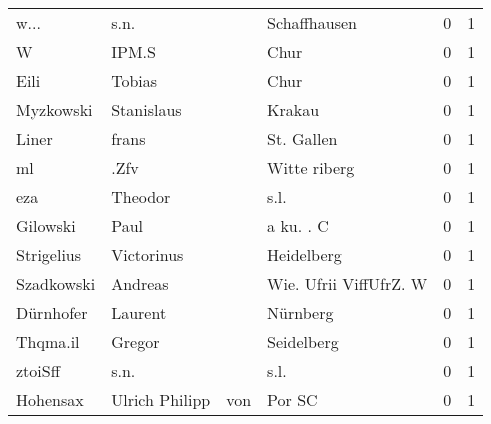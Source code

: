 \begin{center}
\begin{tiny}
\begin{longtabu}{llllrr}
                     w... &                               s.n. &             &                                Schaffhausen &          0 &         1 \\
                        W &                              IPM.S &             &                                        Chur &          0 &         1 \\
                     Eili &                             Tobias &             &                                        Chur &          0 &         1 \\
                Myzkowski &                         Stanislaus &             &                                      Krakau &          0 &         1 \\
                    Liner &                              frans &             &                                  St. Gallen &          0 &         1 \\
                       ml &                               .Zfv &             &                                Witte riberg &          0 &         1 \\
                      eza &                            Theodor &             &                                        s.l. &          0 &         1 \\
                 Gilowski &                               Paul &             &                                   a ku. . C &          0 &         1 \\
               Strigelius &                         Victorinus &             &                                  Heidelberg &          0 &         1 \\
               Szadkowski &                            Andreas &             &                      Wie. Ufrii ViffUfrZ. W &          0 &         1 \\
                Dürnhofer &                            Laurent &             &                                    Nürnberg &          0 &         1 \\
                 Thqma.il &                             Gregor &             &                                  Seidelberg &          0 &         1 \\
                  ztoiSff &                               s.n. &             &                                        s.l. &          0 &         1 \\
                 Hohensax &                     Ulrich Philipp &         von &                                      Por SC &          0 &         1 \\

\end{longtabu}
\end{tiny}
\end{center}
